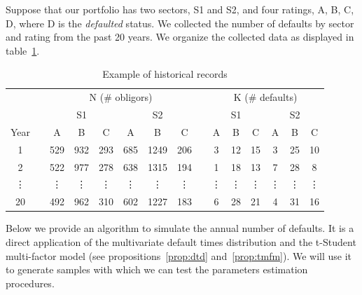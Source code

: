 \documentclass[11pt,fleqn]{book} %
\begin{document}
\begin{example}[]
	Suppose that our portfolio has two sectors, S1 and S2, and four ratings, 
	A, B, C, D, where D is the \emph{defaulted} status. We collected the number 
	of defaults by sector and rating from the past 20 years. We organize the 
	collected data as displayed in table~\ref{table:histdata}.
	\begin{table}[!ht]
		\centering
		\begin{tabular}{cc|c|c|c||c|c|c|  c  |c|c|c||c|c|c|}
			\cline{3-8} \cline{10-15}
			& & \multicolumn{6}{|c|}{N (\# obligors)} & & \multicolumn{6}{|c|}{K (\# defaults)} \\
			\cline{3-8} \cline{10-15}
			& & \multicolumn{3}{|c||}{S1} & \multicolumn{3}{|c|}{S2} & & \multicolumn{3}{|c||}{S1} & \multicolumn{3}{|c|}{S2} \\
			\cline{1-1} \cline{3-8} \cline{10-15}
			\multicolumn{1}{|c|}{Year} & & A & B & C & A & B & C & & A & B & C & A & B & C \\
			\cline{1-1} \cline{3-8} \cline{10-15}
			\multicolumn{1}{|c|}{1} & & 529 & 932 & 293 & 685 & 1249 & 206 & & 3 & 12 & 15 & 3 & 25 & 10 \\
			\cline{1-1} \cline{3-8} \cline{10-15}
			\multicolumn{1}{|c|}{2} & & 522 & 977 & 278 & 638 & 1315 & 194 & & 1 & 18 & 13 & 7 & 28 & 8 \\
			\cline{1-1} \cline{3-8} \cline{10-15}
			\multicolumn{1}{|c|}{\vdots} & & \vdots & \vdots & \vdots & \vdots & \vdots & \vdots & & \vdots & \vdots & \vdots & \vdots & \vdots & \vdots \\
			\cline{1-1} \cline{3-8} \cline{10-15}
			\multicolumn{1}{|c|}{20} & & 492 & 962 & 310 & 602 & 1227 & 183 & & 6 & 28 & 21 & 4 & 31 & 16 \\
			\cline{1-1} \cline{3-8} \cline{10-15}
		\end{tabular}
		\caption{Example of historical records}
		\label{table:histdata}
	\end{table}
\end{example}

Below we provide an algorithm to simulate the annual number of defaults. It 
is a direct application of the multivariate default times distribution and the 
t-Student multi-factor model (see propositions~\ref{prop:dtd} 
and~\ref{prop:tmfm}). We will use it to generate samples with which we can 
test the parameters estimation procedures. 
\end{document}
